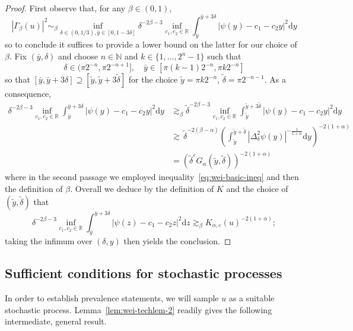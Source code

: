 \documentclass[11pt,oneside,reqno]{amsart}
\newcommand{\mathd}{\mathrm{d}}
\numberwithin{equation}{section}
\begin{document}
\begin{proof}
  First observe that, for any $\beta \in (0, 1),$
  \[ | \Gamma_{\beta} (u) |^2 \sim_{\beta} \inf_{\delta \in (0, 1 / 3),
     \bar{y} \in [0, 1 - 3 \delta]} \delta^{- 2 \beta - 3} \inf_{c_1, c_2 \in
     \mathbb{R}} \int_{\bar{y}}^{\bar{y} + 3 \delta} | \psi (y) - c_1 - c_2 y
     |^2 \mathd y \]
  so to conclude it suffices to provide a lower bound on the latter for our
  choice of $\beta$. Fix $(\bar{y}, \delta)$ and choose $n \in \mathbb{N}$ and
  $k \in \{ 1, \ldots, 2^n - 1 \}$ such that
  \[ \delta \in (\pi 2^{- n}, \pi 2^{- n + 1}], \quad \bar{y} \in [\pi (k - 1)
     2^{- n}, \pi k 2^{- n}] \]
  so that $[\bar{y}, \bar{y} + 3 \delta] \supseteq [\tilde{y}, \tilde{y} + 3
  \tilde{\delta}]$ for the choice $\tilde{y} = \pi k 2^{- n}$, $\tilde{\delta}
  = \pi 2^{- n - 1}$. As a consequence,
\begin{align*}
       \delta^{- 2 \beta - 3} \inf_{c_1, c_2 \in \mathbb{R}}
       \int_{\bar{y}}^{\bar{y} + 3 \delta} | \psi (y) - c_1 - c_2 y |^2 \mathd
       y
 & \gtrsim_{\beta} \tilde{\delta}^{- 2 \beta - 3} \inf_{c_1, c_2
       \in \mathbb{R}} \int_{\tilde{y}}^{\tilde{y} + 3 \tilde{\delta}} | \psi
       (y) - c_1 - c_2 y |^2 \mathd y\\
& \gtrsim \, \tilde{\delta}^{- 2 (\beta - \alpha)}  \left(
       \int_{\tilde{y}}^{\tilde{y} + \tilde{\delta}} | \Delta_{\delta}^2 \psi
       (y) |^{- \frac{1}{1 + \alpha}} \mathd y \right)^{- 2 (1 + \alpha)}\\
& = (\tilde{\delta}^{\varepsilon} G_{\alpha} (\tilde{y},
       \tilde{\delta}))^{- 2 (1 + \alpha)}
\end{align*}
%
  where in the second passage we employed inequality~\eqref{eq:wei-basic-ineq}
  and then the definition of $\beta$. Overall we deduce by the definition of
  $K$ and the choice of $(\tilde{y}, \tilde{\delta})$ that
  \[ \delta^{- 2 \beta - 3} \inf_{c_1, c_2 \in \mathbb{R}}
     \int_{\bar{y}}^{\bar{y} + 3 \delta} | \psi (z) - c_1 - c_2 z |^2 \mathd z
     \gtrsim_{\beta} K_{\alpha, \varepsilon} (u)^{- 2 (1 + \alpha)} ; \]
  taking the infimum over $(\delta, y)$ then yields the conclusion.
\end{proof}

\subsection{Sufficient conditions for stochastic
processes}\label{sec:enhanced-stochastic}

In order to establish prevalence statements, we will sample $u$ as a suitable
stochastic process. Lemma~\ref{lem:wei-techlem-2} readily gives the following
intermediate, general result.
\end{document}

